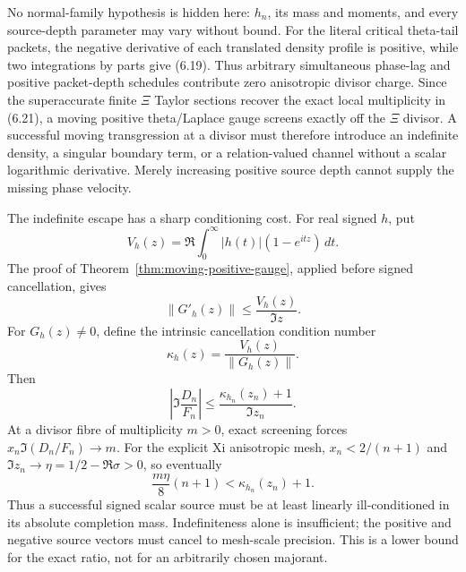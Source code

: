 \documentclass[11pt]{article}
\theoremstyle{definition}
\theoremstyle{remark}
\begin{document}
No normal-family hypothesis is hidden here: $h_n$, its mass and moments, and every source-depth
parameter may vary without bound.  For the literal critical theta-tail packets, the negative
derivative of each translated density profile is positive, while two integrations by parts give
(6.19).  Thus arbitrary simultaneous phase-lag and positive packet-depth schedules contribute
zero anisotropic divisor charge.  Since the superaccurate finite $\Xi$ Taylor sections recover
the exact local multiplicity in (6.21), a moving positive theta/Laplace gauge screens exactly off
the $\Xi$ divisor.  A successful moving transgression at a divisor must therefore introduce an
indefinite density, a singular boundary term, or a relation-valued channel without a scalar
logarithmic derivative.  Merely increasing positive source depth cannot supply the missing
phase velocity.

The indefinite escape has a sharp conditioning cost.  For real signed $h$, put
\[
 V_h(z)=\Re\int_0^\infty |h(t)|(1-e^{itz})\,dt.
\]
The proof of Theorem~\ref{thm:moving-positive-gauge}, applied before signed cancellation, gives
\[
\|G'_h(z)\|\leq\frac{V_h(z)}{\Im z}.
\]
For $G_h(z)\ne0$, define the intrinsic cancellation condition number
\[
 \kappa_h(z)=\frac{V_h(z)}{\|G_h(z)\|}.
\]
Then
\[
 \left|\Im\frac{D_n}{F_n}\right|
 \leq\frac{\kappa_{h_n}(z_n)+1}{\Im z_n}.                 \tag{6.23}
\]
At a divisor fibre of multiplicity $m>0$, exact screening forces
$x_n\Im(D_n/F_n)\to m$.  For the explicit Xi anisotropic mesh,
$x_n<2/(n+1)$ and $\Im z_n\to\eta=1/2-\Re\sigma>0$, so eventually
\[
\frac{m\eta}{8}(n+1)<\kappa_{h_n}(z_n)+1.                \tag{6.24}
\]
Thus a successful signed scalar source must be at least linearly ill-conditioned in its absolute
completion mass.  Indefiniteness alone is insufficient; the positive and negative source vectors
must cancel to mesh-scale precision.  This is a lower bound for the exact ratio, not for an
arbitrarily chosen majorant.
\end{document}
